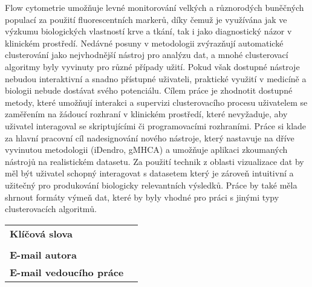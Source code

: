 Flow cytometrie umožňuje levné monitorování velkých a různorodých buněčných populací za použití fluorescentních markerů, díky čemuž je využívána jak ve výzkumu biologických vlastností krve a tkání, tak i jako diagnostický názor v klinickém prostředí. Nedávné posuny v metodologii zvýrazňují automatické clusterování jako nejvhodnější nástroj pro analýzu dat, a mnohé clusterovací algoritmy byly vyvinuty pro různé případy užití. Pokud však dostupné nástroje nebudou interaktivní a snadno přístupné uživateli, praktické využití v medicíně a biologii nebude dostávat svého potenciálu. Cílem práce je zhodnotit dostupné metody, které umožňují interakci a supervizi clusterovacího procesu uživatelem se zaměřením na žádoucí rozhraní v klinickém prostředí, které nevyžaduje, aby uživatel interagoval se skriptujícími či programovacími rozhraními. Práce si klade za hlavní pracovní cíl nadesignování nového nástroje, který nastavuje na dříve vyvinutou metodologii (iDendro, gMHCA) a umožňuje aplikaci zkoumaných nástrojů na realistickém datasetu. Za použití technik z oblasti vizualizace dat by měl být uživatel schopný interagovat s datasetem který je zároveň intuitivní a užitečný pro produkování biologicky relevantních výsledků. Práce by také měla shrnout formáty výmeň dat, které by byly vhodné pro práci s jinými typy clusterovacích algoritmů. 


\bigskip

\begin{tabular}{lp{7.7cm}}
		\textbf{Kl\'i\v cov\'a slova} & \Klic \\
 		& \\
 		\textbf{E-mail autora} & \texttt{\href{mailto:\Email}{\Email}}\\
		\textbf{E-mail vedouc\'iho pr\'ace} & \texttt{\href{mailto:\EmailSup}{\EmailSup}}\\
\end{tabular}

